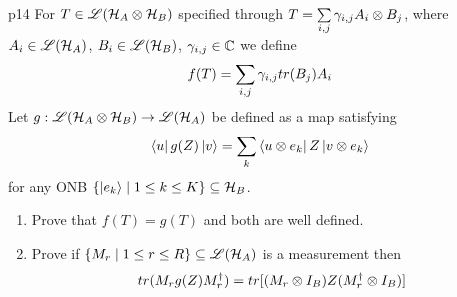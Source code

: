 \documentclass[a4paper, 11pt]{article}
\begin{document}
\begin{problem}{%
	}{p14%
	}
	For $T\in {\mathscr{L}}(\mathcal{H}_A\otimes \mathcal{H}_B)$ specified through $T=\sum\limits_{i,j}\gamma_{i,j}A_i\otimes B_j$, where $A_i\in {\mathscr{L}}(\mathcal{H}_A)$, $B_i\in {\mathscr{L}}(\mathcal{H}_B)$, $\gamma_{i,j}\in \mathbb{C}$ we define $$f(T)=\sum_{i,j}\gamma_{i,j}tr(B_j)A_i$$Let $g:{\mathscr{L}}(\mathcal{H}_A\otimes \mathcal{H}_B) \to {\mathscr{L}}(\mathcal{H}_A)$ be defined as a map satisfying $$\bra{u}g(Z)\ket{v}=\sum_k\bra{u\otimes e_k}Z\ket{v\otimes e_k}$$ for any ONB $\{\ket{e_k}\mid 1\leq k\leq K\}\subseteq \mathcal{H}_B$. \begin{enumerate}
		\item Prove that $f(T)=g(T)$ and both are well defined. \parinn
		\item Prove if $\{M_r\mid 1\leq r\leq R\}\subseteq {\mathscr{L}}(\mathcal{H}_A)$ is a measurement then $$tr(M_rg(Z)M^{\dagger}_r)=tr[(M_r\otimes I_B)Z(M^{\dagger}_r\otimes I_B)]$$
	\end{enumerate}
\end{problem}
\end{document}
